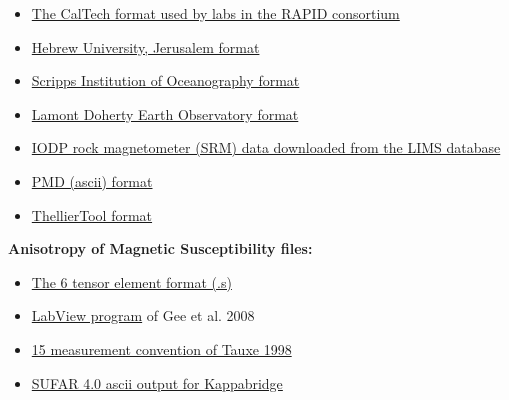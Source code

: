 \documentclass[11pt]{book}
\begin{document}
{\begin{itemize}
\item \href{#cit_magic.py}{The CalTech format used by labs in the RAPID consortium}
\item \href{#huji_magic.py}{Hebrew University, Jerusalem format}
\item \href{#sio_magic.py}{Scripps Institution of Oceanography format}
\item \href{#ldeo_magic.py}{Lamont Doherty Earth Observatory format}
\item \href{#iodp_csv_magic.py}{IODP rock magnetometer (SRM) data downloaded from the LIMS database}
\item \href{#pmd_magic.py}{PMD (ascii) format}
\item \href{#tdt_magic.py}{ThellierTool format}
\end{itemize}


{\bf Anisotropy of Magnetic Susceptibility files:}

\begin{itemize}
\item \href{#s_magic.py}{The 6 tensor element format (.s)}
\item \href{#KLY4S_magic.py}{LabView program} of Gee et al. 2008 \nocite{gee08}
\item \href{#k15\_magic.py}{15 measurement convention of Tauxe 1998 \nocite{tauxe98}}
\item \href{#SUFAR4-asc\_magic.py}{SUFAR 4.0 ascii output for Kappabridge}
\end{itemize}

}
\end{document}
